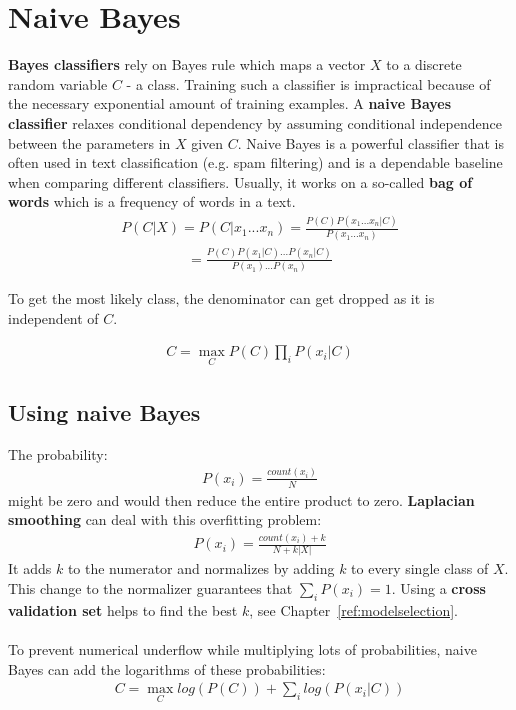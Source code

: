 \documentclass{report}
\begin{document}
\section{Naive Bayes}
{\bf Bayes classifiers} rely on Bayes rule which maps a vector $X$ to a discrete random variable $C$ - a class. Training such a classifier is impractical because of the necessary exponential amount of training examples. A {\bf naive Bayes classifier} relaxes conditional dependency by assuming conditional independence between the parameters in $X$ given $C$. Naive Bayes is a powerful classifier that is often used in text classification (e.g. spam filtering) and is a dependable baseline when comparing different classifiers. Usually, it works on a so-called {\bf bag of words} which is a frequency of words in a text.
\begin{align*}
P(C\vert X) = P(C\vert x_1...x_n) = \frac{P(C)P(x_1...x_n\vert C)}{P(x_1...x_n)}
\end{align*}
\begin{align*}
= \frac{P(C)P(x_1\vert C)...P(x_n\vert C)}{P(x_1)...P(x_n)}
\end{align*}

To get the most likely class, the denominator can get dropped as it is independent of $C$.

\begin{align*}
C = \max\limits_{C} P(C)\prod_iP(x_i\vert C)
\end{align*}

\subsection{Using naive Bayes}
\label{chapter:usingnaivebayes}
The probability:
\begin{align*}
P(x_i) = \frac{count(x_i)}{N}
\end{align*}
might be zero and would then reduce the entire product to zero. {\bf Laplacian smoothing} can deal with this overfitting problem:
\begin{align*}
P(x_i) = \frac{count(x_i)+k}{N+k\vert X\vert}
\end{align*}
It adds $k$ to the numerator and normalizes by adding $k$ to every single class of $X$. This change to the normalizer guarantees that $\sum_i P(x_i) = 1$.
Using a {\bf cross validation set} helps to find the best $k$, see Chapter~\ref{ref:modelselection}.
\\
\\
To prevent numerical underflow while multiplying lots of probabilities, naive Bayes can add the logarithms of these probabilities:
\begin{align*}
C = \max\limits_{C} log(P(C))+\sum_i log(P(x_i\vert C))
\end{align*}
\end{document}
